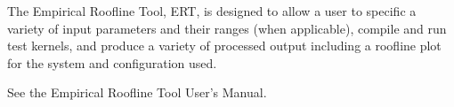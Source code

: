 The Empirical Roofline Tool, ERT, is designed to allow a user to specific a
variety of input parameters and their ranges (when applicable), compile
and run test kernels, and produce a variety of processed output including a
roofline plot for the system and configuration used.

See the Empirical Roofline Tool User's Manual.
